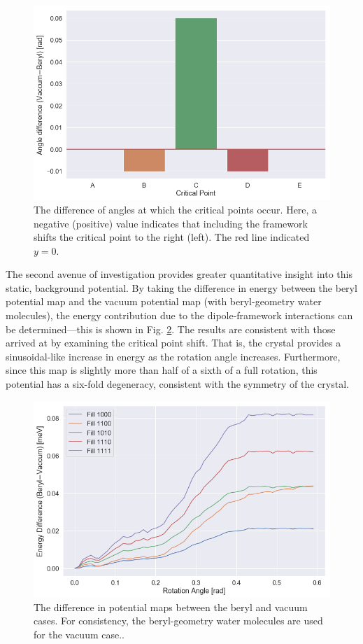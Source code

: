         \begin{figure}
            \centering
            \includegraphics[width=0.9\linewidth]{Figures/System/cp_diff.png}
            \caption{The difference of angles at which the critical points occur. Here, a negative (positive) value indicates that including the framework shifts the critical point to the right (left). The red line indicated $y=0$.}
            \label{fig:cp_diff}
        \end{figure}
        
        The second avenue of investigation provides greater quantitative insight into this static, background potential. By taking the difference in energy between the beryl potential map and the vacuum potential map (with beryl-geometry water molecules), the energy contribution due to the dipole-framework interactions can be determined---this is shown in Fig. \ref{fig:framework_contrubtion}. The results are consistent with those arrived at by examining the critical point shift. That is, the crystal provides a sinusoidal-like increase in energy as the rotation angle increases. Furthermore, since this map is slightly more than half of a sixth of a full rotation, this potential has a six-fold degeneracy, consistent with the symmetry of the crystal. 
        
        \begin{figure}
            \centering
            \includegraphics[width=0.9\linewidth]{Figures/System/diff_analysis.png}
            \caption{The difference in potential maps between the beryl and vacuum cases. For consistency, the beryl-geometry water molecules are used for the vacuum case..}
            \label{fig:framework_contrubtion}
        \end{figure}
        

